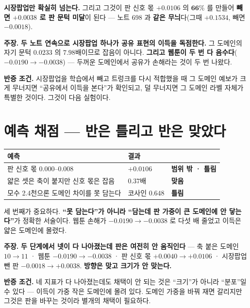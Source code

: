 \documentclass[10pt,a4paper]{article}
\newcommand{\claim}[2]{\begin{claimbox}\textbf{주장.} #1\par\smallskip
  \textcolor{gray!70}{\textbf{반증 조건.} #2}\end{claimbox}}
\begin{document}
\textbf{시장팝업만 확실히 넘는다.} 그리고 그것이 판 신호 몫 $+0.0106$ 의
$\mathbf{66\%}$ 를 만들어 \textbf{빼면 $+0.0038$ 로 판 문턱 미달}이 된다 ---
노트 698 과 \textbf{같은 무늬}다(그때 $+0.1534$, 빼면 $-0.0018$).

\claim{\textbf{두 노트 연속으로 시장팝업 하나가 공유 표현의 이득을 독점한다.}
그 도메인의 자기 문턱 $0.0233$ 의 $7.98$배이므로 잡음이 아니다. \textbf{그리고
웹툰이 두 번 다 음수다}($-0.0190 \to -0.0038$) --- 두꺼운 도메인에서 공유가
손해라는 것이 두 번 나왔다.}
{시장팝업을 학습에서 빼고 트렁크를 다시 적합했을 때 그 도메인 예보가 크게 무너지면
``공유에서 이득을 본다''가 확인되고, 덜 무너지면 그 도메인 라벨 자체가 특별한
것이다. 그것이 다음 실험이다.}

\section{예측 채점 --- 반은 틀리고 반은 맞았다}

\begin{center}
\begin{tabular}{lll}
\toprule
예측 & 결과 & \\
\midrule
판 신호 몫 $0.000$--$0.008$ & $+0.0106$ & \textbf{범위 밖 · 틀림} \\
얇은 셋은 축이 붙지만 신호 몫은 잡음 & $0.37$배 & \textbf{맞음} \\
모수 2.4천으론 도메인 차이를 못 담는다 & 코사인 $0.648$ & \textbf{틀림} \\
\bottomrule
\end{tabular}
\end{center}

세 번째가 중요하다. \textbf{``못 담는다''가 아니라 ``담는데 판 가중이 큰 도메인에
안 닿는다''}가 정확한 서술이다. 웹툰 손해가 $-0.0190 \to -0.0038$ 로 다섯 배
줄었고 이득은 얇은 도메인에 몰렸다.

\claim{\textbf{두 단계에서 넷이 다 나아졌는데 판은 여전히 안 움직인다} ---
축 붙은 도메인 $10 \to 11$ · 웹툰 $-0.0190 \to -0.0038$ · 판 신호 몫
$+0.0040 \to +0.0106$ · 시장팝업 뺀 판 $-0.0018 \to +0.0038$.
\textbf{방향은 맞고 크기가 안 맞는다.}}
{네 지표가 다 나아졌는데도 채택이 안 되는 것은 ``크기''가 아니라 ``분포''일 수
있다 --- 이득이 가중 작은 도메인에 몰려 있다. 도메인 가중을 바꿔 재면 갈리지만
그것은 판을 바꾸는 것이라 별개의 채택이 필요하다.}
\end{document}
